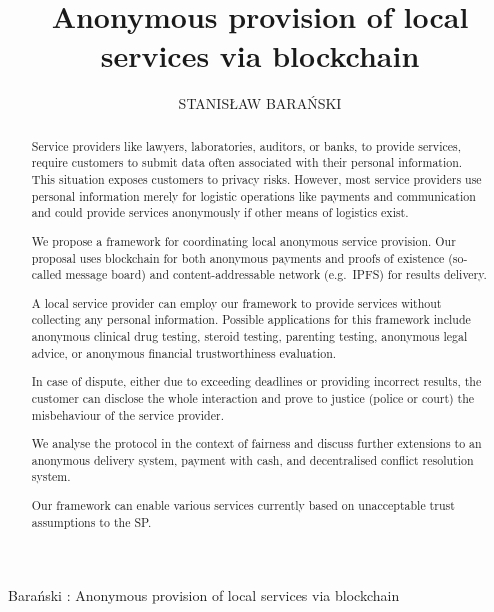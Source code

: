 \documentclass{ieeeaccess}
\begin{document}

\title{Anonymous provision of local services via blockchain}
\author{\uppercase{Stanis\l{}aw Bara{\'n}ski}}

\address[1]{Department of Electronic, Telecommunication and Informatics, Gdansk University of Technology, Narutowicza 11/12 Gdansk Poland (e-mail: stanislaw.baranski@pg.edu.pl}


{Bara{\'n}ski : 
Anonymous provision of local services via blockchain}


\begin{abstract}
Service providers like lawyers, laboratories, auditors, or banks, to
provide services, require customers to submit data often
associated with their personal information. This situation exposes
customers to privacy risks. However, most service providers use personal information merely for logistic operations like payments
and communication and could provide services anonymously if other means of logistics exist.

We propose a framework for coordinating local anonymous service
provision. Our proposal uses blockchain for both anonymous payments and proofs of existence (so-called message board) and content-addressable network (e.g.~IPFS) for results delivery.

A local service provider can employ our framework to provide
services without collecting any personal information. Possible
applications for this framework include anonymous clinical drug testing,
steroid testing, parenting testing, anonymous legal advice, or
anonymous financial trustworthiness evaluation.

In case of dispute, either due to exceeding deadlines or providing
incorrect results, the customer can disclose the whole interaction and
prove to justice (police or court) the misbehaviour of the service
provider.

We analyse the protocol in the context of fairness and discuss further
extensions to an anonymous delivery system, payment with cash, and
decentralised conflict resolution system.

Our framework can enable various services currently based on unacceptable trust assumptions to the SP.
\end{abstract}
\end{document}
